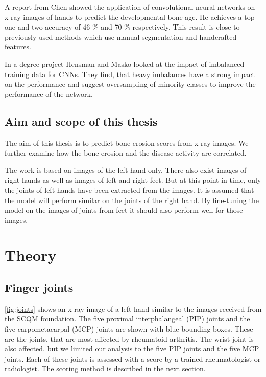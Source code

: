 \documentclass[12pt]{article}
\begin{document}
A report from Chen \cite{chen_2016} showed the application of convolutional neural networks on x-ray images of hands to predict the developmental bone age. He achieves a top one and two accuracy of 46 \% and 70 \% respectively. This result is close to previously used methods which use manual segmentation and handcrafted features.

In a degree project Hensman and Masko \cite{hensman_2015} looked at the impact of imbalanced training data for CNNs. They find, that heavy imbalances have a strong impact on the performance and suggest oversampling of minority classes to improve the performance of the network.

\subsection{Aim and scope of this thesis}

The aim of this thesis is to predict bone erosion scores from x-ray images. We further examine how the bone erosion and the disease activity are correlated.

The work is based on images of the left hand only. There also exist images of right hands as well as images of left and right feet. But at this point in time, only the joints of left hands have been extracted from the images. It is assumed that the model will perform similar on the joints of the right hand. By fine-tuning the model on the images of joints from feet it should also perform well for those images.

\newpage

\section{Theory}
\label{sec:theory}

\subsection{Finger joints}
\label{subsec:joints}

\autoref{fig:joints} shows an x-ray image of a left hand similar to the images received from the SCQM foundation. The five proximal interphalangeal (PIP) joints and the five carpometacarpal (MCP) joints are shown with blue bounding boxes. These are the joints, that are most affected by rheumatoid arthritis. The wrist joint is also affected, but we limited our analysis to the five PIP joints and the five MCP joints. Each of these joints is assessed with a score by a trained rheumatologist or radiologist. The scoring method is described in the next section.
\end{document}
